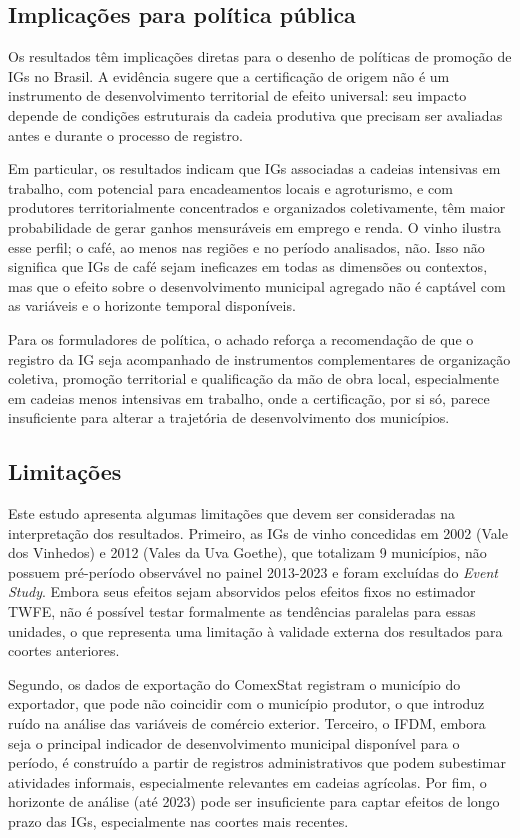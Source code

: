 \documentclass[12pt, a4paper]{article}
\begin{document}
\subsection{Implicações para política pública}

Os resultados têm implicações diretas para o desenho de políticas de promoção de IGs no Brasil. A evidência sugere que a certificação de origem não é um instrumento de desenvolvimento territorial de efeito universal: seu impacto depende de condições estruturais da cadeia produtiva que precisam ser avaliadas antes e durante o processo de registro.

Em particular, os resultados indicam que IGs associadas a cadeias intensivas em trabalho, com potencial para encadeamentos locais e agroturismo, e com produtores territorialmente concentrados e organizados coletivamente, têm maior probabilidade de gerar ganhos mensuráveis em emprego e renda. O vinho ilustra esse perfil; o café, ao menos nas regiões e no período analisados, não. Isso não significa que IGs de café sejam ineficazes em todas as dimensões ou contextos, mas que o efeito sobre o desenvolvimento municipal agregado não é captável com as variáveis e o horizonte temporal disponíveis.

Para os formuladores de política, o achado reforça a recomendação de que o registro da IG seja acompanhado de instrumentos complementares de organização coletiva, promoção territorial e qualificação da mão de obra local, especialmente em cadeias menos intensivas em trabalho, onde a certificação, por si só, parece insuficiente para alterar a trajetória de desenvolvimento dos municípios.

\subsection{Limitações}

Este estudo apresenta algumas limitações que devem ser consideradas na interpretação dos resultados. Primeiro, as IGs de vinho concedidas em 2002 (Vale dos Vinhedos) e 2012 (Vales da Uva Goethe), que totalizam 9 municípios, não possuem pré-período observável no painel 2013-2023 e foram excluídas do \textit{Event Study}. Embora seus efeitos sejam absorvidos pelos efeitos fixos no estimador TWFE, não é possível testar formalmente as tendências paralelas para essas unidades, o que representa uma limitação à validade externa dos resultados para coortes anteriores.

Segundo, os dados de exportação do ComexStat registram o município do exportador, que pode não coincidir com o município produtor, o que introduz ruído na análise das variáveis de comércio exterior. Terceiro, o IFDM, embora seja o principal indicador de desenvolvimento municipal disponível para o período, é construído a partir de registros administrativos que podem subestimar atividades informais, especialmente relevantes em cadeias agrícolas. Por fim, o horizonte de análise (até 2023) pode ser insuficiente para captar efeitos de longo prazo das IGs, especialmente nas coortes mais recentes.
\end{document}
